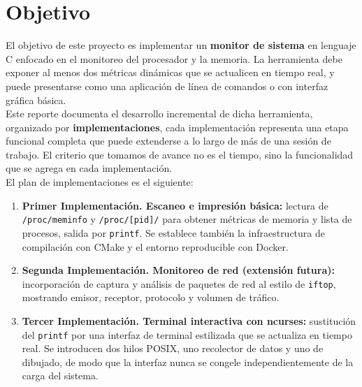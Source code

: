 \documentclass[12pt,letterpaper]{article}
\begin{document}


\newpage

\section*{Objetivo}

El objetivo de este proyecto es implementar un \textbf{monitor de sistema} en lenguaje C enfocado en el
monitoreo del procesador y la memoria. La herramienta debe exponer al menos dos métricas dinámicas que se
actualicen en tiempo real, y puede presentarse como una aplicación de línea de comandos o con interfaz
gráfica básica.\\

Este reporte documenta el desarrollo incremental de dicha herramienta, organizado por \textbf{implementaciones},
cada implementación representa una etapa funcional completa que puede extenderse a lo largo de más de una sesión
de trabajo. El criterio que tomamos de avance no es el tiempo, sino la funcionalidad que se agrega en cada
implementación.\\

El plan de implementaciones es el siguiente:
\begin{enumerate}[leftmargin=1.5cm]
\item \textbf{Primer Implementación. Escaneo e impresión básica:} lectura de \texttt{/proc/meminfo} y
  \texttt{/proc/[pid]/} para obtener métricas de memoria y lista de procesos, salida por \texttt{printf}. Se
  establece también la infraestructura de compilación con CMake y el entorno reproducible con Docker.
  
\item \textbf{Segunda Implementación. Monitoreo de red (extensión futura):} incorporación de captura y análisis
  de paquetes de red al estilo de \texttt{iftop}, mostrando emisor, receptor, protocolo y volumen de tráfico.
  
\item \textbf{Tercer Implementación. Terminal interactiva con ncurses:} sustitución del \texttt{printf} por una
  interfaz de terminal estilizada que se actualiza en tiempo real. Se introducen dos hilos POSIX, uno recolector
  de datos y uno de dibujado, de modo que la interfaz nunca se congele independientemente de la carga del sistema.
\end{enumerate}
\end{document}
